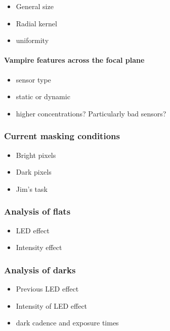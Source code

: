 \begin{itemize}
\tightlist
\item
  General size
\item
  Radial kernel
\item
  uniformity
\end{itemize}

\paragraph{Vampire features across the focal
plane}\label{vampire-features-across-the-focal-plane}

\begin{itemize}
\tightlist
\item
  sensor type
\item
  static or dynamic
\item
  higher concentrations? Particularly bad sensors?
\end{itemize}

\subsubsection{Current masking
conditions}\label{current-masking-conditions}

\begin{itemize}
\tightlist
\item
  Bright pixels
\item
  Dark pixels
\item
  Jim's task
\end{itemize}

\subsubsection{Analysis of flats}\label{analysis-of-flats}

\begin{itemize}
\tightlist
\item
  LED effect
\item
  Intensity effect
\end{itemize}

\subsubsection{Analysis of darks}\label{analysis-of-darks}

\begin{itemize}
\tightlist
\item
  Previous LED effect
\item
  Intensity of LED effect
\item
  dark cadence and exposure times
\end{itemize}

